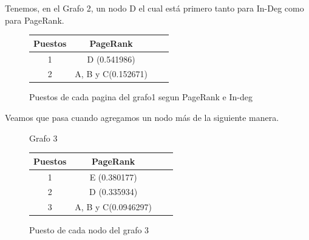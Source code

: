 Tenemos, en el Grafo 2, un nodo D el cual está primero tanto para In-Deg como para PageRank.

\begin{figure}[H]
\centering
\begin{tabular}{| c | c | c | c |}
  \hline
  Puestos & PageRank\\ \hline \hline
  1 & D (0.541986)\\ \hline
  2 & A, B y C(0.152671)\\ \hline
\end{tabular}
  \caption{\footnotesize{Puestos de cada pagina del grafo1 segun PageRank e In-deg}}
  \label{fig:Rankings}
\end{figure}

Veamos que pasa cuando agregamos un nodo más de la siguiente manera.

\begin{figure}[H]
\centering
{}
  \caption{\footnotesize{ Grafo 3 }}
  \label{fig:Rankings}
\end{figure}

\begin{figure}[H]
\centering
\begin{tabular}{| c | c | c | c |}
  \hline
  Puestos & PageRank\\ \hline \hline
  1 & E (0.380177)\\ \hline
  2 & D (0.335934)\\ \hline
  3 & A, B y C(0.0946297)\\ \hline
\end{tabular}
  \caption{\footnotesize{Puesto de cada nodo del grafo 3}}
  \label{fig:Rankings}
\end{figure}

